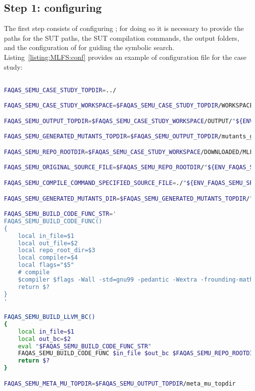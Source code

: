\subsection{Step 1: configuring \SEMUS}

The first step consists of configuring \SEMUS; for doing so it is necessary to provide the paths for the SUT paths, the SUT compilation commands, the output folders, and the configuration of \SEMU for guiding the symbolic search. Listing~\ref{listing:MLFS:conf} provides an example of configuration file for the case study: 

\begin{lstlisting}[language=bash,label=listing:MLFS:conf,caption=faqas\_semus\_conf.sh file for MLFS case study.]

FAQAS_SEMU_CASE_STUDY_TOPDIR=../

FAQAS_SEMU_CASE_STUDY_WORKSPACE=$FAQAS_SEMU_CASE_STUDY_TOPDIR/WORKSPACE

FAQAS_SEMU_OUTPUT_TOPDIR=$FAQAS_SEMU_CASE_STUDY_WORKSPACE/OUTPUT/"${ENV_FAQAS_SEMU_SRC_FILE%.c}"

FAQAS_SEMU_GENERATED_MUTANTS_TOPDIR=$FAQAS_SEMU_OUTPUT_TOPDIR/mutants_generation

FAQAS_SEMU_REPO_ROOTDIR=$FAQAS_SEMU_CASE_STUDY_WORKSPACE/DOWNLOADED/MLFS-QDP_I1_R1/BL-SC/E1356-GTD-BL-01_I1_R2/

FAQAS_SEMU_ORIGINAL_SOURCE_FILE=$FAQAS_SEMU_REPO_ROOTDIR/"${ENV_FAQAS_SEMU_SRC_FILE}"

FAQAS_SEMU_COMPILE_COMMAND_SPECIFIED_SOURCE_FILE=./"${ENV_FAQAS_SEMU_SRC_FILE}"

FAQAS_SEMU_GENERATED_MUTANTS_DIR=$FAQAS_SEMU_GENERATED_MUTANTS_TOPDIR/"${ENV_FAQAS_SEMU_SRC_FILE%.c}"

FAQAS_SEMU_BUILD_CODE_FUNC_STR='
FAQAS_SEMU_BUILD_CODE_FUNC()
{
    local in_file=$1
    local out_file=$2
    local repo_root_dir=$3
    local compiler=$4
    local flags="$5"
    # compile
    $compiler $flags -Wall -std=gnu99 -pedantic -Wextra -frounding-math -fsignaling-nans -g -O0 -fno-builtin -I$repo_root_dir/include -I$repo_root_dir/libm/common -I$repo_root_dir/libm/math -I$repo_root_dir/libm/mlfs -o $out_file $in_file $flags
    return $?
}
'

FAQAS_SEMU_BUILD_LLVM_BC()
{
    local in_file=$1
    local out_bc=$2
    eval "$FAQAS_SEMU_BUILD_CODE_FUNC_STR"
    FAQAS_SEMU_BUILD_CODE_FUNC $in_file $out_bc $FAQAS_SEMU_REPO_ROOTDIR clang '-c -emit-llvm'
    return $?
}

FAQAS_SEMU_META_MU_TOPDIR=$FAQAS_SEMU_OUTPUT_TOPDIR/meta_mu_topdir


\end{lstlisting}
